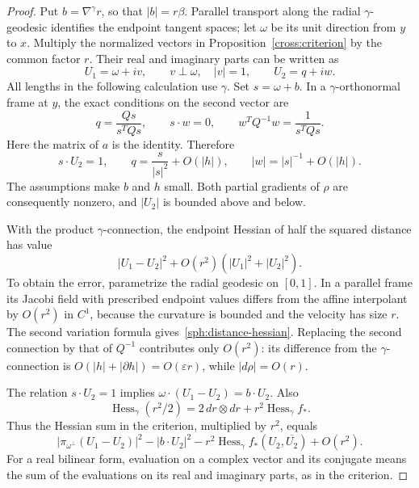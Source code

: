 \begin{proof}
Put $b=\nabla^\gamma r$, so that $|b|=r\beta$.  Parallel transport
along the radial $\gamma$-geodesic identifies the endpoint tangent
spaces; let $\omega$ be its unit direction from $y$ to $x$.
Multiply the normalized vectors in Proposition~\ref{cross:criterion}
by the common factor $r$.  Their real and imaginary parts can be
written as
\[
 U_1=\omega+i v,\qquad v\perp\omega,\quad |v|=1,
 \qquad U_2=q+i w.
\]
All lengths in the following calculation use $\gamma$.  Set
$s=\omega+b$.  In a $\gamma$-orthonormal frame at $y$, the exact
conditions on the second vector are
\begin{equation}\label{sph:test-vectors}
 q=\frac{Qs}{s^TQs},\qquad s\cdot w=0,\qquad
 w^TQ^{-1}w=\frac1{s^TQs}.
\end{equation}
Here the matrix of $a$ is the identity.  Therefore
\begin{equation}\label{sph:test-vector-bounds}
 s\cdot U_2=1,\qquad
 q=\frac{s}{|s|^2}+O(|h|),\qquad
 |w|=|s|^{-1}+O(|h|).
\end{equation}
The assumptions make $b$ and $h$ small.  Both partial gradients of
$\rho$ are consequently nonzero, and $|U_2|$ is bounded above and below.

With the product $\gamma$-connection, the endpoint Hessian of half
the squared distance has value
\begin{equation}\label{sph:distance-hessian}
 |U_1-U_2|^2+O(r^2)(|U_1|^2+|U_2|^2).
\end{equation}
To obtain the error, parametrize the radial geodesic on $[0,1]$.
In a parallel frame its Jacobi field with prescribed endpoint values
differs from the affine interpolant by $O(r^2)$ in $C^1$, because the
curvature is bounded and the velocity has size $r$.  The second
variation formula gives~\eqref{sph:distance-hessian}.
Replacing the second connection by that of $Q^{-1}$ contributes only
$O(r^2)$: its difference from the $\gamma$-connection is
$O(|h|+|\partial h|)=O(\varepsilon r)$, while $|d\rho|=O(r)$.

The relation $s\cdot U_2=1$ implies
$\omega\cdot(U_1-U_2)=b\cdot U_2$.  Also
\[
 \operatorname{Hess}_\gamma(r^2/2)
   =2\,dr\otimes dr+r^2\operatorname{Hess}_\gamma f_*.
\]
Thus the Hessian sum in the criterion, multiplied by $r^2$, equals
\begin{equation}\label{sph:test-expression}
 |\pi_{\omega^\perp}(U_1-U_2)|^2-|b\cdot U_2|^2
       -r^2\operatorname{Hess}_\gamma f_*(U_2,\overline{U_2})
       +O(r^2).
\end{equation}
For a real bilinear form, evaluation on a complex vector and its
conjugate means the sum of the evaluations on its real and imaginary
parts, as in the criterion.


\end{proof}
